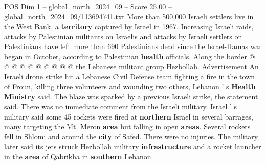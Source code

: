 \begin{textsample}{POS Dim 1 – global\_north\_2024\_09 – Score 25.00 – global\_north\_2024\_09/113694741.txt}
More than 500,000 Israeli settlers live in the West Bank, a \textbf{territory} captured by Israel in 1967.
Increasing Israeli raids, attacks by Palestinian militants on Israelis and attacks by Israeli settlers on Palestinians have left more than 690 Palestinians dead since the Israel-Hamas war began in October, according to Palestinian \textbf{health} officials.
Along the border @ @ @ @ @ @ @ @ @ @ the Lebanese militant group Hezbollah.
Advertisement An Israeli drone strike hit a Lebanese Civil Defense team fighting a fire in the town of Froun, killing three volunteers and wounding two others, Lebanon ' s \textbf{Health} \textbf{Ministry} said.
The blaze was sparked by a previous Israeli strike, the statement said.
There was no immediate comment from the Israeli military.
Israel ' s military said some 45 rockets were fired at \textbf{northern} Israel in several barrages, many targeting the Mt.
Meron \textbf{area} but falling in open \textbf{areas}.
Several rockets fell in Shlomi and around the \textbf{city} of Safed.
There were no injuries.
The military later said its jets struck Hezbollah military \textbf{infrastructure} and a rocket launcher in the \textbf{area} of Qabrikha in \textbf{southern} Lebanon.

\end{textsample}
